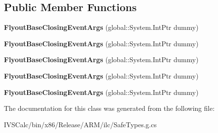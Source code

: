 \subsection*{Public Member Functions}
\begin{DoxyCompactItemize}
\item 
\mbox{\label{class_windows_1_1_u_i_1_1_xaml_1_1_controls_1_1_primitives_1_1_flyout_base_closing_event_args_a882a6f9ba141db9bb6cb9fac667f1dfe}} 
{\bfseries Flyout\+Base\+Closing\+Event\+Args} (global\+::\+System.\+Int\+Ptr dummy)
\item 
\mbox{\label{class_windows_1_1_u_i_1_1_xaml_1_1_controls_1_1_primitives_1_1_flyout_base_closing_event_args_a882a6f9ba141db9bb6cb9fac667f1dfe}} 
{\bfseries Flyout\+Base\+Closing\+Event\+Args} (global\+::\+System.\+Int\+Ptr dummy)
\item 
\mbox{\label{class_windows_1_1_u_i_1_1_xaml_1_1_controls_1_1_primitives_1_1_flyout_base_closing_event_args_a882a6f9ba141db9bb6cb9fac667f1dfe}} 
{\bfseries Flyout\+Base\+Closing\+Event\+Args} (global\+::\+System.\+Int\+Ptr dummy)
\item 
\mbox{\label{class_windows_1_1_u_i_1_1_xaml_1_1_controls_1_1_primitives_1_1_flyout_base_closing_event_args_a882a6f9ba141db9bb6cb9fac667f1dfe}} 
{\bfseries Flyout\+Base\+Closing\+Event\+Args} (global\+::\+System.\+Int\+Ptr dummy)
\item 
\mbox{\label{class_windows_1_1_u_i_1_1_xaml_1_1_controls_1_1_primitives_1_1_flyout_base_closing_event_args_a882a6f9ba141db9bb6cb9fac667f1dfe}} 
{\bfseries Flyout\+Base\+Closing\+Event\+Args} (global\+::\+System.\+Int\+Ptr dummy)
\end{DoxyCompactItemize}


The documentation for this class was generated from the following file\+:\begin{DoxyCompactItemize}
\item 
I\+V\+S\+Calc/bin/x86/\+Release/\+A\+R\+M/ilc/Safe\+Types.\+g.\+cs\end{DoxyCompactItemize}

